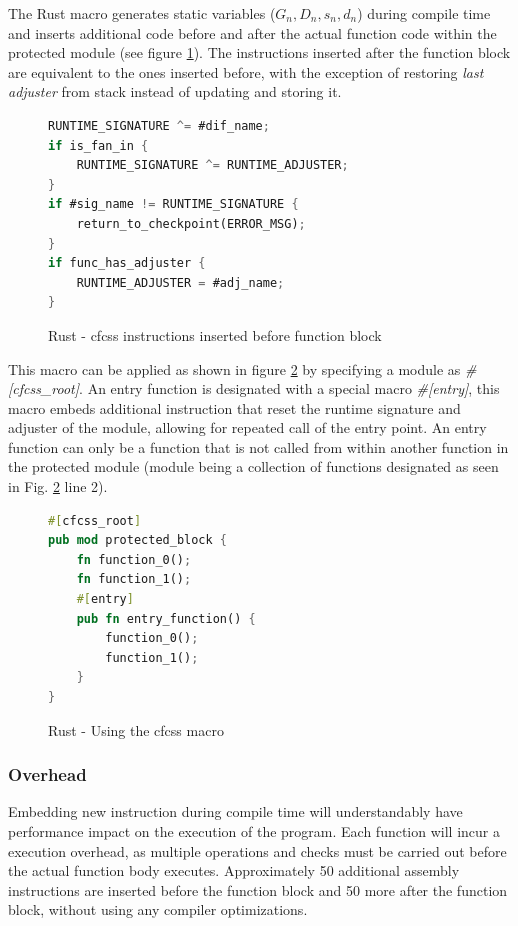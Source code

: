 The Rust macro generates static variables ({$G_n, D_n, s_n, d_n$}) during compile time and inserts additional code before and after the actual function code within the protected module (see figure \ref{fig:rust_cfcss_macro}). The instructions inserted after the function block are equivalent to the ones inserted before, with the exception of restoring \textit{last adjuster} from stack instead of updating and storing it.

\begin{figure}[!h]
\begin{lstlisting}[language=Rust]
RUNTIME_SIGNATURE ^= #dif_name;
if is_fan_in {
    RUNTIME_SIGNATURE ^= RUNTIME_ADJUSTER;
}
if #sig_name != RUNTIME_SIGNATURE {
    return_to_checkpoint(ERROR_MSG);
}
if func_has_adjuster {
    RUNTIME_ADJUSTER = #adj_name;
}
\end{lstlisting}
\caption{Rust - \acrshort{cfcss} instructions inserted before function block}
\label{fig:rust_cfcss_macro}
\end{figure}

This macro can be applied as shown in figure \ref{fig:rust_cfcss_macro_example} by specifying a module as \textit{\#[cfcss\_root]}. An entry function is designated with a special macro \textit{\#[entry]}, this macro embeds additional instruction that reset the runtime signature and adjuster of the module, allowing for repeated call of the entry point. An entry function can only be a function that is not called from within another function in the protected module (module being a collection of functions designated as seen in Fig. \ref{fig:rust_cfcss_macro_example} line 2).

\begin{figure}[!h]
\begin{lstlisting}[language=Rust]
#[cfcss_root]
pub mod protected_block {
    fn function_0();
    fn function_1();
    #[entry]
    pub fn entry_function() {
        function_0();
        function_1();
    }
}
\end{lstlisting}
\caption{Rust - Using the \acrshort{cfcss} macro}
\label{fig:rust_cfcss_macro_example}
\end{figure}

\subsubsection{Overhead}

Embedding new instruction during compile time will understandably have performance impact on the execution of the program. Each function will incur a execution overhead, as multiple operations and checks must be carried out before the actual function body executes. Approximately 50 additional assembly instructions are inserted before the function block and 50 more after the function block, without using any compiler optimizations.

